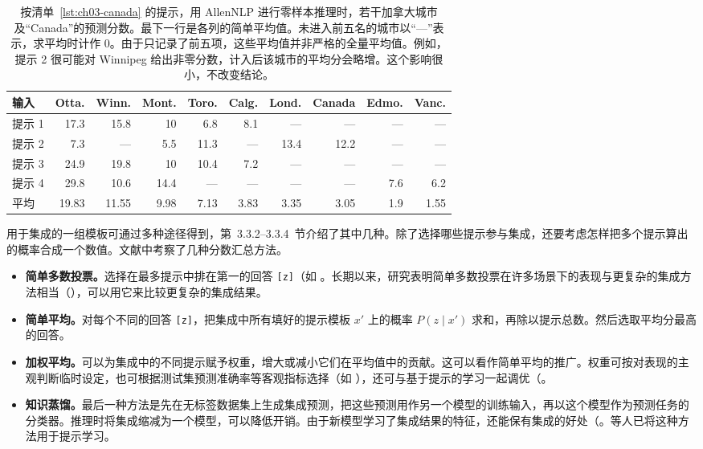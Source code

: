\begin{table}[!htbp]
\centering
\caption{按清单~\ref{lst:ch03-canada} 的提示，用 AllenNLP 进行零样本推理时，若干加拿大城市及“Canada”的预测分数。最下一行是各列的简单平均值。未进入前五名的城市以“—”表示，求平均时计作 0。由于只记录了前五项，这些平均值并非严格的全量平均值。例如，提示 2 很可能对 Winnipeg 给出非零分数，计入后该城市的平均分会略增。这个影响很小，不改变结论。}
\label{tab:ch03-ensemble}
\small
\setlength{\tabcolsep}{2.5pt}
\begin{tabular}{@{}lrrrrrrrrr@{}}
\toprule
输入 & Otta. & Winn. & Mont. & Toro. & Calg. & Lond. & Canada & Edmo. & Vanc.\\
\midrule
提示 1 & 17.3 & 15.8 & 10 & 6.8 & 8.1 & — & — & — & —\\
提示 2 & 7.3 & — & 5.5 & 11.3 & — & 13.4 & 12.2 & — & —\\
提示 3 & 24.9 & 19.8 & 10 & 10.4 & 7.2 & — & — & — & —\\
提示 4 & 29.8 & 10.6 & 14.4 & — & — & — & — & 7.6 & 6.2\\
平均 & 19.83 & 11.55 & 9.98 & 7.13 & 3.83 & 3.35 & 3.05 & 1.9 & 1.55\\
\bottomrule
\end{tabular}
\end{table}

用于集成的一组模板可通过多种途径得到，第~3.3.2--3.3.4~节介绍了其中几种。除了选择哪些提示参与集成，还要考虑怎样把多个提示算出的概率合成一个数值。文献中考察了几种分数汇总方法。

\begin{itemize}
\item \textbf{简单多数投票。}选择在最多提示中排在第一的回答 \texttt{[z]}（如 。长期以来，研究表明简单多数投票在许多场景下的表现与更复杂的集成方法相当（），可以用它来比较更复杂的集成结果。
\item \textbf{简单平均。}对每个不同的回答 \texttt{[z]}，把集成中所有填好的提示模板 $x'$ 上的概率 $P(z\mid x')$ 求和，再除以提示总数。然后选取平均分最高的回答。
\item \textbf{加权平均。}可以为集成中的不同提示赋予权重，增大或减小它们在平均值中的贡献。这可以看作简单平均的推广。权重可按对表现的主观判断临时设定，也可根据测试集预测准确率等客观指标选择（如 ），还可与基于提示的学习一起调优（。
\item \textbf{知识蒸馏。}最后一种方法是先在无标签数据集上生成集成预测，把这些预测用作另一个模型的训练输入，再以这个模型作为预测任务的分类器。推理时将集成缩减为一个模型，可以降低开销。由于新模型学习了集成结果的特征，还能保有集成的好处（。等人已将这种方法用于提示学习。
\end{itemize}

